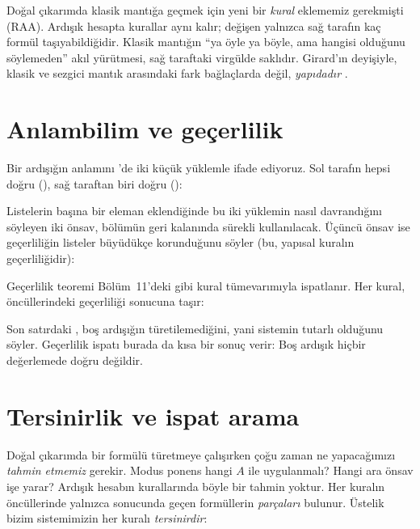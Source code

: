\begin{onemlifikir}[Önemli Fikir: Klasik mantık = çok sonuçlu ardışıklar]
Doğal çıkarımda klasik mantığa geçmek için yeni bir \emph{kural}
eklememiz gerekmişti (RAA). Ardışık hesapta kurallar aynı kalır; değişen
yalnızca sağ tarafın kaç formül taşıyabildiğidir. Klasik mantığın ``ya
öyle ya böyle, ama hangisi olduğunu söylemeden'' akıl yürütmesi, sağ
taraftaki virgülde saklıdır. Girard'ın deyişiyle, klasik ve sezgici mantık
arasındaki fark bağlaçlarda değil, \emph{yapıdadır} \citep{girard1989}.
\end{onemlifikir}

\section{Anlambilim ve geçerlilik}\label{sec:ardisik-gecerlilik}

Bir ardışığın anlamını \Lean{}'de iki küçük yüklemle ifade ediyoruz. Sol
tarafın hepsi doğru (), sağ taraftan biri doğru
():


\noindent Listelerin başına bir eleman eklendiğinde bu iki yüklemin nasıl
davrandığını söyleyen iki önsav, bölümün geri kalanında sürekli
kullanılacak. Üçüncü önsav ise geçerliliğin listeler büyüdükçe
korunduğunu söyler (bu, yapısal kuralın geçerliliğidir):


\noindent Geçerlilik teoremi Bölüm~11'deki gibi kural tümevarımıyla
ispatlanır. Her kural, öncüllerindeki geçerliliği sonucuna taşır:


\noindent Son satırdaki , boş ardışığın
türetilemediğini, yani sistemin tutarlı olduğunu söyler. Geçerlilik
ispatı burada da kısa bir sonuç verir: Boş ardışık hiçbir değerlemede
doğru değildir.

\section{Tersinirlik ve ispat arama}\label{sec:tersinirlik}

Doğal çıkarımda bir formülü türetmeye çalışırken çoğu zaman ne yapacağımızı
\emph{tahmin etmemiz} gerekir. Modus ponens hangi $A$ ile uygulanmalı?
Hangi ara önsav işe yarar? Ardışık hesabın kurallarında böyle bir tahmin
yoktur. Her kuralın öncüllerinde yalnızca sonucunda geçen formüllerin
\emph{parçaları} bulunur. Üstelik bizim sistemimizin her kuralı
\emph{tersinirdir}:


